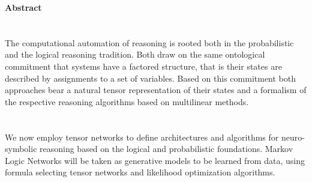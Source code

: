 \documentclass[
    final,
    paper=a4,
    pagesize=auto,
    fontsize=10pt, %
    version=last,
]{scrbook}
\begin{document}
    \listoftodos

    \frontmatter

    

    \pagestyle{scrplain}

    \cleardoublepage

    \tableofcontents

    \newpage
    \textbf{Abstract} \\
    

    
    
    

    \mainmatter

    \part{\partonetext}\label{par:one}

    The computational automation of reasoning is rooted both in the probabilistic and the logical reasoning tradition.
    Both draw on the same ontological commitment that systems have a factored structure, that is their states are described by assignments to a set of variables.
    Based on this commitment both approaches bear a natural tensor representation of their states and a formalism of the respective reasoning algorithms based on multilinear methods.

    
    

    
    


    \part{\parttwotext}\label{par:two}

    We now employ tensor networks to define architectures and algorithms for neuro-symbolic reasoning based on the logical and probabilistic foundations.
    Markov Logic Networks will be taken as generative models to be learned from data, using formula selecting tensor networks and likelihood optimization algorithms.

    
\end{document}
